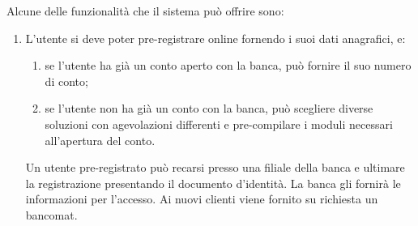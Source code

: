 \documentclass[10pt]{softeng} %
\begin{document}
Alcune delle funzionalit\`a che il sistema pu\`o offrire sono:
\begin{enumerate}
	\item L'utente si deve poter pre-registrare online fornendo i suoi dati anagrafici, e:
		\begin{enumerate}
			\item se l'utente ha gi\`a un conto aperto con la banca, pu\`o fornire il suo numero di conto;
			\item se l'utente non ha gi\`a un conto con la banca, pu\`o scegliere diverse soluzioni con agevolazioni differenti e pre-compilare i moduli necessari all'apertura del conto.
		\end{enumerate}
		Un utente pre-registrato pu\`o recarsi presso una filiale della banca e ultimare la registrazione presentando il documento d'identit\`a.
		La banca gli fornir\`a le informazioni per l'accesso.
		Ai nuovi clienti viene fornito su richiesta un bancomat.


\end{enumerate}
\end{document}
